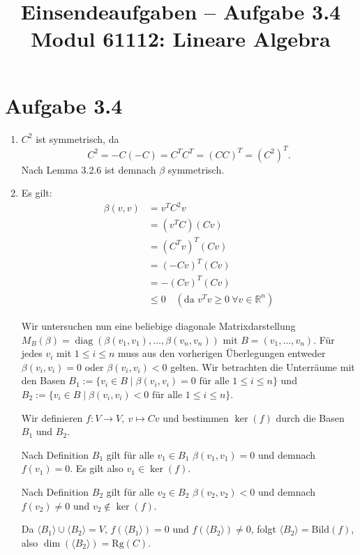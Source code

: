 \documentclass[a4paper,12pt]{article}
\title{Einsendeaufgaben -- Aufgabe 3.4\\[0.5em]
\large Modul 61112: Lineare Algebra}
\author{}
\date{}
\begin{document}
\maketitle

\section*{Aufgabe 3.4}

\begin{enumerate}[label=\alph*)]

    \item
    $C^2$ ist symmetrisch, da
    \[
      C^2 = -C(-C) = C^T C^T = (CC)^T = (C^2)^T.
    \]
    Nach Lemma 3.2.6 ist demnach $\beta$ symmetrisch.

    \item
    Es gilt:
    \begin{align*}
      \beta(v,v) &= v^T C^2 v \\
                 &= (v^T C)(C v) \\
                 &= (C^T v)^T (C v) \\
                 &= (-C v)^T (C v) \\
                 &= -(C v)^T (C v) \\
                 &\leq 0 \quad (\text{da } v^T v \geq 0\ \forall v \in \mathbb{R}^n)
    \end{align*}

    Wir untersuchen nun eine beliebige diagonale Matrixdarstellung
    $M_B(\beta) = \operatorname{diag}(\beta(v_1, v_1), \ldots, \beta(v_n, v_n))$
    mit $B = (v_1, \ldots, v_n)$. Für jedes $v_i$ mit $1 \leq i \leq n$ muss
    aus den vorherigen Überlegungen entweder $\beta(v_i, v_i) = 0$ oder
    $\beta(v_i, v_i) < 0$ gelten. Wir betrachten die Unterräume mit den Basen
    $B_1 := \{v_i \in B \mid \beta(v_i, v_i) = 0 \text{ für alle } 1 \leq i \leq n\}$
    und $B_2 := \{v_i \in B \mid \beta(v_i, v_i) < 0 \text{ für alle } 1 \leq i \leq n\}$.

    Wir definieren $f: V \to V,\ v \mapsto C v$ und bestimmen $\ker(f)$ durch
    die Basen $B_1$ und $B_2$.

    Nach Definition $B_1$ gilt für alle $v_1 \in B_1$ $\beta(v_1, v_1) = 0$
    und demnach $f(v_1) = 0$. Es gilt also $v_1 \in \ker(f)$.

    Nach Definition $B_2$ gilt für alle $v_2 \in B_2$ $\beta(v_2, v_2) < 0$
    und demnach $f(v_2) \neq 0$ und $v_2 \notin \ker(f)$.

    Da $\langle B_1 \rangle \cup \langle B_2 \rangle = V$, $f(\langle B_1 \rangle) = 0$
    und $f(\langle B_2 \rangle) \neq 0$, folgt $\langle B_2 \rangle = \mathrm{Bild}(f)$,
    also $\dim(\langle B_2 \rangle) = \mathrm{Rg}(C)$.


\end{enumerate}
\end{document}
